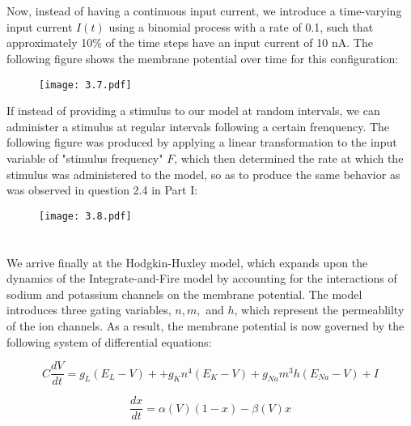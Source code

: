 \documentclass{article}
\begin{document}
\section{}
Now, instead of having a continuous input current, we introduce a time-varying input current $I(t)$ using a binomial process with a rate of 0.1, such that approximately 10\% of the time steps have an input current of 10 nA. The following figure shows the membrane potential over time for this configuration:

\begin{figure}[ht]
    \centering
    \texttt{[image: 3.7.pdf]}   
\end{figure}

If instead of providing a stimulus to our model at random intervals, we can administer a stimulus at regular intervals following a certain frenquency. The following figure was produced by applying a linear transformation to the input variable of "stimulus frequency" $F$, which then determined the rate at which the stimulus was administered to the model, so as to produce the same behavior as was observed in question 2.4 in Part I:

\begin{figure}[ht]
    \centering
    \texttt{[image: 3.8.pdf]}   
\end{figure}


\setcounter{section}{0}
\renewcommand{\thesection}{2.\arabic{section}}
\FloatBarrier
\section{}
We arrive finally at the Hodgkin-Huxley model, which expands upon the dynamics of the Integrate-and-Fire model by accounting for the interactions of sodium and potassium channels on the membrane potential. The model introduces three gating variables, $n, m,$ and $h$, which represent the permeablilty of the ion channels. As a result, the membrane potential is now governed by the following system of differential equations:

\begin{equation}
    C \frac{dV}{dt} = g_L (E_L - V) + + g_Kn^4(E_K - V) + g_{Na}m^3h(E_{Na} - V) + I
\end{equation}

\begin{equation}
    \frac{dx}{dt} = \alpha (V)(1 - x) - \beta (V)x
\end{equation}
\vspace{2px}
\end{document}
